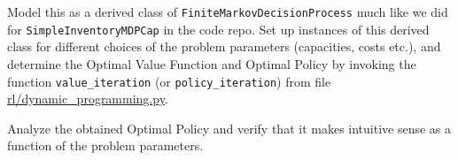 \documentclass[12pt]{exam}
\begin{document}
\begin{questions}
Model this as a derived class of \lstinline{FiniteMarkovDecisionProcess} much like we did for \lstinline{SimpleInventoryMDPCap} in the code repo. Set up instances of this derived class for different choices of the problem parameters (capacities, costs etc.), and determine the Optimal Value Function and Optimal Policy by invoking the function \lstinline{value_iteration} (or \lstinline{policy_iteration}) from file \href{https://github.com/TikhonJelvis/RL-book/blob/master/rl/dynamic_programming.py}{rl\//dynamic\_programming.py}.

Analyze the obtained Optimal Policy and verify that it makes intuitive sense as a function of the problem parameters.

\end{questions}
\end{document}

